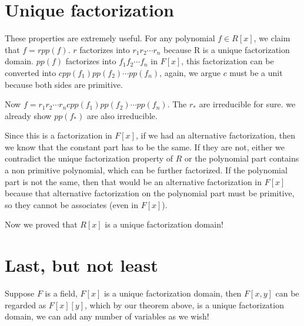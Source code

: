 \documentclass{article}
\begin{document}
\section*{Unique factorization}
These properties are extremely useful. For any polynomial $ f \in R[x] $, we claim that $ f = r pp(f) $. $ r $ factorizes into $ r_1 r_2 \cdots r_n $ because R is a unique factorization domain. $ pp(f) $ factorizes into $ f_1 f_2 \cdots f_n $ in $ F[x] $, this factorization can be converted into $ c pp(f_1) pp(f_2) \cdots pp(f_n) $, again, we argue $ c $ must be a unit because both sides are primitive. 

Now $ f = r_1 r_2 \cdots r_n c pp(f_1) pp(f_2) \cdots pp(f_n) $. The $ r_* $ are irreducible for sure. we already show $ pp(f_*) $ are also irreducible. 

Since this is a factorization in $ F[x] $, if we had an alternative factorization, then we know that the constant part has to be the same. If they are not, either we contradict the unique factorization property of $ R $ or the polynomial part contains a non primitive polynomial, which can be further factorized. If the polynomial part is not the same, then that would be an alternative factorization in $ F[x] $ because that alternative factorization on the polynomial part must be primitive, so they cannot be associates (even in $ F[x] $).

Now we proved that $ R[x] $ is a unique factorization domain!

\section*{Last, but not least}
Suppose $ F $ is a field, $ F[x] $ is a unique factorization domain, then $ F[x, y] $ can be regarded as $ F[x][y] $, which by our theorem above, is a unique factorization domain, we can add any number of variables as we wish!
\end{document}
